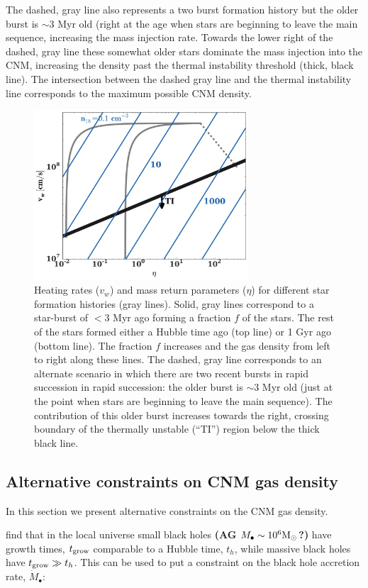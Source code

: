 \documentclass[usenatbib,fleqn]{mn2e}
\newcommand{\Mbh}[1][]{M_{\bullet#1}}
\renewcommand{\th}{t_h}
\newcommand{\Msun}{{\rm M_\odot}}
\begin{document}
The dashed, gray line also represents a two burst formation history
but the older burst is $\sim 3$ Myr old (right at the age when stars
are beginning to leave the main sequence, increasing the mass
injection rate. Towards the lower right of the dashed, gray line these
somewhat older stars dominate the mass injection into the CNM,
increasing the density past the thermal instability threshold (thick,
black line). The intersection between the dashed gray line and the
thermal instability line corresponds to the maximum possible CNM
density.

\begin{figure} 
  \includegraphics[width=8cm]{cnm_plot.pdf}
  \caption{\label{fig:param} Heating rates ($v_w$) and mass return
    parameters ($\eta$) for different star formation histories (gray
    lines). Solid, gray lines correspond to a star-burst of $<3$ Myr
    ago forming a fraction $f$ of the stars. The rest of the stars
    formed either a Hubble time ago (top line) or 1 Gyr ago (bottom
    line). The fraction $f$ increases and the gas density from left to
    right along these lines. The dashed, gray line corresponds to an
    alternate scenario in which there are two recent bursts in rapid
    succession in rapid succession: the older burst is $\sim 3$ Myr
    old (just at the point when stars are beginning to leave the main
    sequence). The contribution of this older burst increases towards
    the right, crossing boundary of the thermally unstable (``TI'')
    region below the thick black line.}
\end{figure}


\subsection{Alternative constraints on CNM gas density}
In this section we present alternative constraints on the CNM gas
density.  

\citet{Heckman+2004} find that in the local universe small black
holes {\bf (AG $\Mbh\sim 10^6 \Msun$?)} have growth times, $t_{\rm grow}$
comparable to a Hubble time, $t_h$, while massive black holes have
$t_{\rm grow} \gg \th$. This can be used to put a constraint on the
black hole accretion rate, $\dot{M}_{\bullet}$:
\end{document}
